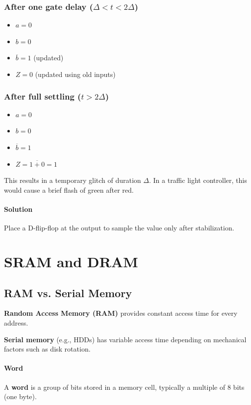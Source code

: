 \documentclass{article}
\begin{document}
\subsubsection*{After one gate delay ($\Delta < t < 2\Delta$)}
\begin{itemize}
    \item $a = 0$
    \item $b = 0$
    \item $\overline{b} = 1$ (updated)
    \item $Z = 0$ (updated using old inputs)
\end{itemize}

\subsubsection*{After full settling ($t > 2\Delta$)}
\begin{itemize}
    \item $a = 0$
    \item $b = 0$
    \item $\overline{b} = 1$
    \item $Z = \overline{1 + 0} = 1$
\end{itemize}

This results in a temporary glitch of duration $\Delta$.  
In a traffic light controller, this would cause a brief flash of green after red.

\paragraph{Solution}
Place a D-flip-flop at the output to sample the value only after stabilization.

\section{SRAM and DRAM}

\subsection{RAM vs. Serial Memory}

\textbf{Random Access Memory (RAM)} provides constant access time for every address.

\textbf{Serial memory} (e.g., HDDs) has variable access time depending on mechanical factors such as disk rotation.

\paragraph{Word}
A \textbf{word} is a group of bits stored in a memory cell, typically a multiple of 8 bits (one byte).
\end{document}
